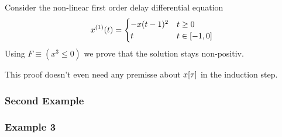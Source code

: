 \documentclass[10pt]{report}
\begin{document}
                Consider the non-linear first order delay differential equation
                \begin{equation}
                    \D{x}(t) = \begin{cases}
                         -x(t-1)^2 & t \geq 0\\
                         t & t \in [-1,0]
                    \end{cases}
                \end{equation}
                Using $F\equiv(x^3\leq 0)$ we prove that the solution stays non-positiv.
                \begin{sequentdeduction}
                \end{sequentdeduction}
                This proof doesn't even need any premisse about $x[\tau]$ in the induction step.
            \subsubsection{Second Example}
            \label{sec:second-example}

            \subsubsection{Example 3}
                \label{sec:ddi-example-3}
\end{document}
